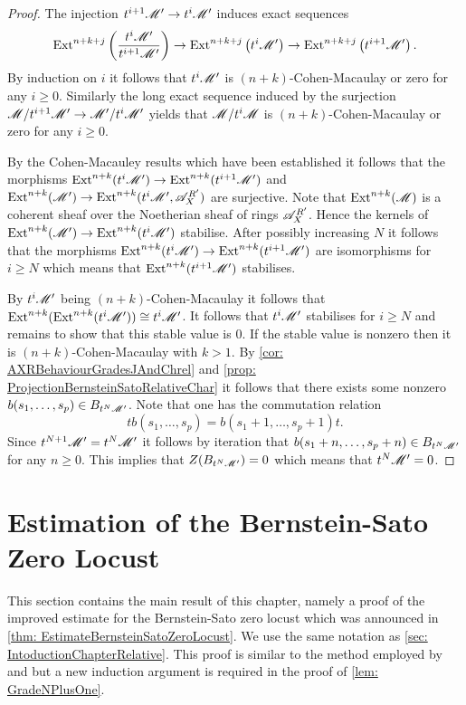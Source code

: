 \begin{proof}
  The injection $t^{i+1} \mathscr{M}'\to t^{i}\mathscr{M}'$ induces exact sequences
  $$\operatorname{Ext}^{n+k+j}\left(\frac{t^i\mathscr{M}'}{ t^{i+1}\mathscr{M}'}\right) \to  \operatorname{Ext}^{n+k+j}\left(t^{i}\mathscr{M}'\right) \to \operatorname{Ext}^{n+k +j}\left(t^{i+1} \mathscr{M}'\right).$$
  By induction on $i$ it follows that $t^i\mathscr{M}'$ is $(n+k)$-Cohen-Macaulay or zero for any $i\geq 0$.
  Similarly the long exact sequence induced by the surjection $\mathscr{M}/t^{i+1}\mathscr{M}' \to \mathscr{M}'/t^{i}\mathscr{M}'$ yields that $\mathscr{M}/t^{i}\mathscr{M}$ is $(n+k)$-Cohen-Macaulay or zero for any $i\geq 0$.


  By the Cohen-Macauley results which have been established it follows that the morphisms $\operatorname{Ext}^{n+k}( t^i\mathscr{M}') \to  \operatorname{Ext}^{n+k}(t^{i+1}\mathscr{M}')$ and $\operatorname{Ext}^{n+k}(\mathscr{M}') \to \operatorname{Ext}^{n+k} (t^i\mathscr{M}',\allowbreak \mathscr{A}_X^{R'})$ are surjective.
  Note that $\operatorname{Ext}^{n+k}(\mathscr{M})$ is a coherent sheaf over the Noetherian sheaf of rings $\mathscr{A}_X^{R'}$.
  Hence the kernels of $\operatorname{Ext}^{n+k}(\mathscr{M}') \to \operatorname{Ext}^{n+k} (t^i\mathscr{M}')$ stabilise.
  After possibly increasing $N$ it follows that the morphisms $\operatorname{Ext}^{n+k}(t^i\mathscr{M}') \to  \operatorname{Ext}^{n+k}(t^{i+1}\mathscr{M}')$ are isomorphisms for $i\geq N$ which means that $\operatorname{Ext}^{n+k}(t^{i+1}\mathscr{M}')$ stabilises.

  By $t^i \mathscr{M}'$ being $(n+k)$-Cohen-Macaulay it follows that $\operatorname{Ext}^{n+k}(\operatorname{Ext}^{n+k}(t^i\mathscr{M}')) \cong t^i\mathscr{M}'$.
  It follows that $t^i \mathscr{M}'$ stabilises for $i\geq N$ and remains to show that this stable value is $0$.
  If the stable value is nonzero then it is $(n+k)$-Cohen-Macaulay with $k>1$.
  By \cref{cor: AXRBehaviourGradesJAndChrel} and \cref{prop: ProjectionBernsteinSatoRelativeChar} it follows that there exists some nonzero $b(s_1,\ldots,s_p) \in B_{t^N\mathscr{M}'}$.
  Note that one has the commutation relation
  $$tb(s_1,\ldots,s_p) = b(s_1+1,\ldots, s_p + 1)t.$$
  Since $t^{N+1}\mathscr{M}' = t^N\mathscr{M}'$ it follows by iteration that $b(s_1+n,\ldots, s_p + n)\in B_{t^N \mathscr{M}'}$ for any $n\geq 0$.
  This implies that $Z(B_{t^N\mathscr{M}'}) = 0$ which means that $t^N\mathscr{M}' = 0$.
\end{proof}
\section{Estimation of the Bernstein-Sato Zero Locust}
This section contains the main result of this chapter, namely a proof of the improved estimate for the Bernstein-Sato zero locust which was announced in \cref{thm: EstimateBernsteinSatoZeroLocust}.
We use the same notation as \cref{sec: IntoductionChapterRelative}.
This proof is similar to the method employed by \cite{lichtin1989poles} and \cite{kashiwara1976b} but a new induction argument is required in the proof of \cref{lem: GradeNPlusOne}.\\

